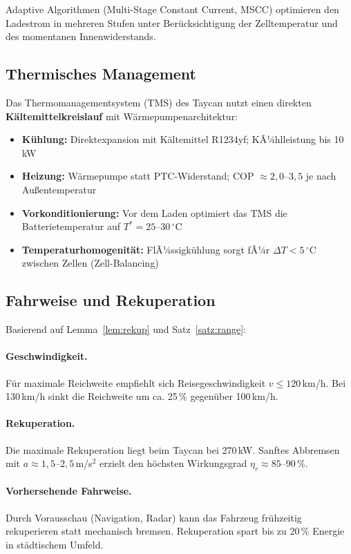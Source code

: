 ﻿\documentclass[a4paper,12pt]{article}
\theoremstyle{definition}
\begin{document}
Adaptive Algorithmen (Multi-Stage Constant Current, MSCC) optimieren den
Ladestrom in mehreren Stufen unter Ber\"ucksichtigung der Zelltemperatur
und des momentanen Innenwiderstands.

\subsection{Thermisches Management}

Das Thermomanagementsystem (TMS) des Taycan nutzt einen direkten
\textbf{K\"altemittelkreislauf} mit W\"armepumpenarchitektur:

\begin{itemize}
  \item \textbf{K\"uhlung:} Direktexpansion mit K\"altemittel R1234yf;
    KÃ¼hlleistung bis 10\,kW
  \item \textbf{Heizung:} W\"armepumpe statt PTC-Widerstand;
    COP $\approx 2{,}0$--$3{,}5$ je nach Au\ss{}entemperatur
  \item \textbf{Vorkonditionierung:} Vor dem Laden optimiert das TMS
    die Batterietemperatur auf $T^* = 25$--$30\,^{\circ}\mathrm{C}$
  \item \textbf{Temperaturhomogenit\"at:} FlÃ¼ssigk\"uhlung sorgt fÃ¼r
    $\Delta T < 5\,^{\circ}\mathrm{C}$ zwischen Zellen (Zell-Balancing)
\end{itemize}

\subsection{Fahrweise und Rekuperation}

Basierend auf Lemma~\ref{lem:rekup} und Satz~\ref{satz:range}:

\paragraph{Geschwindigkeit.} F\"ur maximale Reichweite empfiehlt sich
Reisegeschwindigkeit $v \leq 120$\,km/h. Bei 130\,km/h sinkt die Reichweite
um ca. 25\,\% gegen\"uber 100\,km/h.

\paragraph{Rekuperation.} Die maximale Rekuperation liegt beim Taycan bei
270\,kW. Sanftes Abbremsen mit $a \approx 1{,}5$--$2{,}5$\,m/s$^2$ erzielt
den h\"ochsten Wirkungsgrad $\eta_r \approx 85$--$90\,\%$.

\paragraph{Vorhersehende Fahrweise.} Durch Vorausschau (Navigation, Radar)
kann das Fahrzeug fr\"uhzeitig rekuperieren statt mechanisch bremsen.
Rekuperation spart bis zu 20\,\% Energie in st\"adtischem Umfeld.
\end{document}
